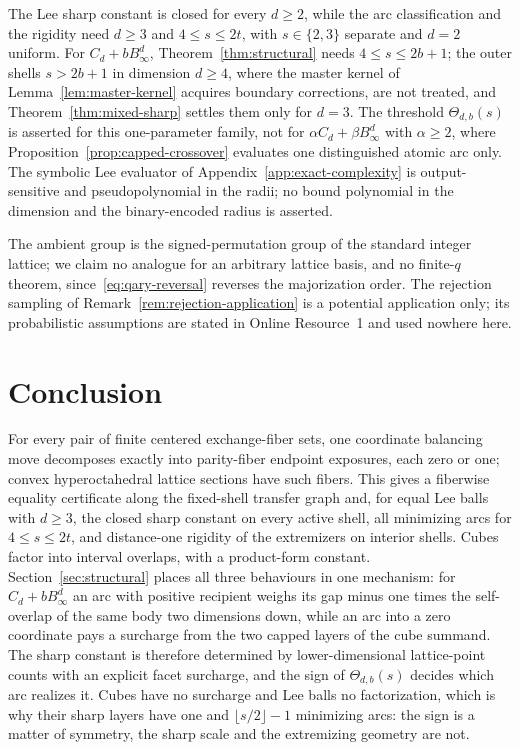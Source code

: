 \documentclass[pdflatex,sn-mathphys-num]{sn-jnl}
\theoremstyle{thmstyleone}
\theoremstyle{thmstylethree}
\theoremstyle{thmstyletwo}
\begin{document}
The Lee sharp constant is closed for every
$d\ge2$, while the arc classification and the rigidity need $d\ge3$ and
$4\le s\le2t$, with $s\in\{2,3\}$ separate and $d=2$ uniform.
For $C_d+bB_\infty^d$,
Theorem~\ref{thm:structural} needs $4\le s\le2b+1$; the outer shells
$s>2b+1$ in dimension $d\ge4$, where the master kernel of
Lemma~\ref{lem:master-kernel} acquires boundary corrections, are not treated,
and Theorem~\ref{thm:mixed-sharp} settles them only for $d=3$.  The threshold
$\Theta_{d,b}(s)$ is asserted for this one-parameter family, not for
$\alpha C_d+\beta B_\infty^d$ with $\alpha\ge2$, where
Proposition~\ref{prop:capped-crossover} evaluates one distinguished atomic arc
only.  The symbolic Lee evaluator of Appendix~\ref{app:exact-complexity} is
output-sensitive and pseudopolynomial in the radii; no bound polynomial in the
dimension and the binary-encoded radius is asserted.

The ambient group is the signed-permutation group of the standard integer
lattice; we claim no analogue for an arbitrary lattice basis, and no
finite-$q$ theorem, since~\eqref{eq:qary-reversal} reverses the majorization
order.  The rejection sampling of Remark~\ref{rem:rejection-application} is a
potential application only; its probabilistic assumptions are stated in Online
Resource~1 and used nowhere here.



\section{Conclusion}

For every pair of finite centered exchange-fiber sets, one coordinate
balancing move decomposes exactly into parity-fiber endpoint exposures, each
zero or one; convex hyperoctahedral lattice sections have such fibers.  This
gives a fiberwise equality certificate along the fixed-shell transfer graph
and, for equal Lee balls with $d\ge3$, the closed sharp constant on every
active shell, all minimizing arcs for $4\le s\le2t$, and distance-one rigidity
of the extremizers on interior shells.  Cubes factor into interval overlaps,
with a product-form constant.  Section~\ref{sec:structural} places all three
behaviours in one mechanism: for $C_d+bB_\infty^d$ an arc with positive
recipient weighs its gap minus one times the self-overlap of the same body two
dimensions down, while an arc into a zero coordinate pays a surcharge from the
two capped layers of the cube summand.  The sharp constant is therefore
determined by lower-dimensional lattice-point counts with an explicit facet
surcharge, and the sign of $\Theta_{d,b}(s)$ decides which arc realizes it.
Cubes have no surcharge and Lee balls no factorization, which is why their
sharp layers have one and $\lfloor s/2\rfloor-1$ minimizing arcs: the sign is a
matter of symmetry, the sharp scale and the extremizing geometry are not.
\end{document}
